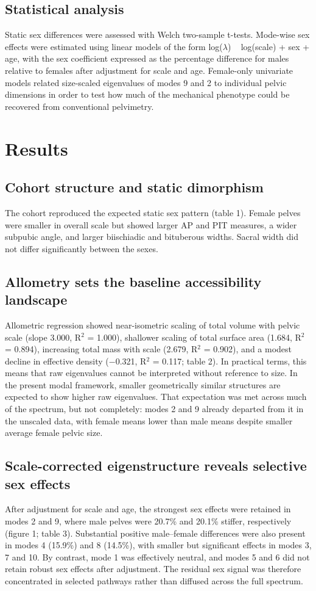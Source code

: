 \documentclass[openacc]{rsproca_new}
\begin{document}
\subsection{Statistical analysis}
Static sex differences were assessed with Welch two-sample t-tests. Mode-wise sex effects were estimated using linear models of the form log($\lambda$) ~ log(scale) + sex + age, with the sex coefficient expressed as the percentage difference for males relative to females after adjustment for scale and age. Female-only univariate models related size-scaled eigenvalues of modes 9 and 2 to individual pelvic dimensions in order to test how much of the mechanical phenotype could be recovered from conventional pelvimetry.

\section{Results}
\subsection{Cohort structure and static dimorphism}
The cohort reproduced the expected static sex pattern (table 1). Female pelves were smaller in overall scale but showed larger AP and PIT measures, a wider subpubic angle, and larger biischiadic and bituberous widths. Sacral width did not differ significantly between the sexes.

\subsection{Allometry sets the baseline accessibility landscape}
Allometric regression showed near-isometric scaling of total volume with pelvic scale (slope 3.000, R$^2$ = 1.000), shallower scaling of total surface area (1.684, R$^2$ = 0.894), increasing total mass with scale (2.679, R$^2$ = 0.902), and a modest decline in effective density (−0.321, R$^2$ = 0.117; table 2). In practical terms, this means that raw eigenvalues cannot be interpreted without reference to size. In the present modal framework, smaller geometrically similar structures are expected to show higher raw eigenvalues. That expectation was met across much of the spectrum, but not completely: modes 2 and 9 already departed from it in the unscaled data, with female means lower than male means despite smaller average female pelvic size.

\subsection{Scale-corrected eigenstructure reveals selective sex effects}
After adjustment for scale and age, the strongest sex effects were retained in modes 2 and 9, where male pelves were 20.7\% and 20.1\% stiffer, respectively (figure 1; table 3). Substantial positive male--female differences were also present in modes 4 (15.9\%) and 8 (14.5\%), with smaller but significant effects in modes 3, 7 and 10. By contrast, mode 1 was effectively neutral, and modes 5 and 6 did not retain robust sex effects after adjustment. The residual sex signal was therefore concentrated in selected pathways rather than diffused across the full spectrum.
\end{document}
